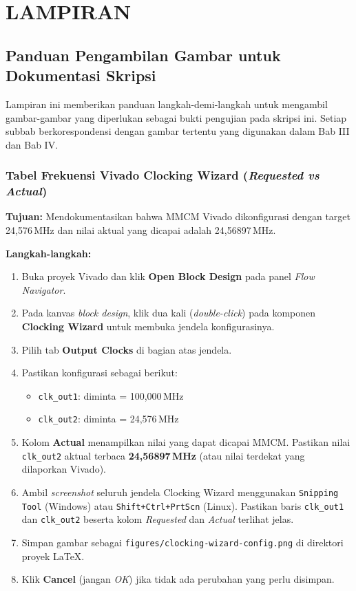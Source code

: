 \chapter*{LAMPIRAN}

\section{Panduan Pengambilan Gambar untuk Dokumentasi Skripsi}
\label{app:panduan-gambar}

Lampiran ini memberikan panduan langkah-demi-langkah untuk mengambil gambar-gambar
yang diperlukan sebagai bukti pengujian pada skripsi ini. Setiap subbab berkorespondensi
dengan gambar tertentu yang digunakan dalam Bab III dan Bab IV.

\subsection{Tabel Frekuensi Vivado Clocking Wizard (\textit{Requested vs Actual})}
\label{app:panduan-clkwiz}

\textbf{Tujuan:} Mendokumentasikan bahwa MMCM Vivado dikonfigurasi dengan target
24,576\,MHz dan nilai aktual yang dicapai adalah 24,56897\,MHz.

\textbf{Langkah-langkah:}
\begin{enumerate}
\item Buka proyek Vivado dan klik \textbf{Open Block Design} pada panel \textit{Flow Navigator}.
\item Pada kanvas \textit{block design}, klik dua kali (\textit{double-click}) pada komponen
      \textbf{Clocking Wizard} untuk membuka jendela konfigurasinya.
\item Pilih tab \textbf{Output Clocks} di bagian atas jendela.
\item Pastikan konfigurasi sebagai berikut:
      \begin{itemize}
      \item \texttt{clk\_out1}: diminta = 100,000\,MHz
      \item \texttt{clk\_out2}: diminta = 24,576\,MHz
      \end{itemize}
\item Kolom \textbf{Actual} menampilkan nilai yang dapat dicapai MMCM. Pastikan nilai
      \texttt{clk\_out2} aktual terbaca \textbf{24,56897\,MHz} (atau nilai terdekat yang
      dilaporkan Vivado).
\item Ambil \textit{screenshot} seluruh jendela Clocking Wizard menggunakan
      \texttt{Snipping Tool} (Windows) atau \texttt{Shift+Ctrl+PrtScn} (Linux).
      Pastikan baris \texttt{clk\_out1} dan \texttt{clk\_out2} beserta kolom
      \textit{Requested} dan \textit{Actual} terlihat jelas.
\item Simpan gambar sebagai \texttt{figures/clocking-wizard-config.png} di direktori
      proyek LaTeX.
\item Klik \textbf{Cancel} (jangan \textit{OK}) jika tidak ada perubahan yang perlu disimpan.
\end{enumerate}

